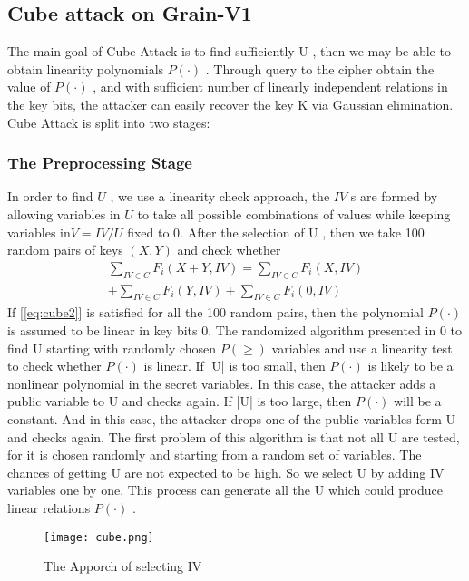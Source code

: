 \subsection{Cube attack on Grain-V1}
The main goal of Cube Attack is to find sufficiently U , then we may be able to
obtain linearity polynomials $P(\cdot)$ . Through query to the cipher obtain the value of
$P(\cdot)$ , and with sufficient number of linearly independent relations in the key bits,
the attacker can easily recover the key K via Gaussian elimination. Cube Attack is
split into two stages:
\subsubsection{The Preprocessing Stage}
In order to find $U$ , we use a linearity check approach, the $IV$ s are formed by
allowing variables in $U$ to take all possible combinations of values while keeping
variables in$ V  = IV/U$ fixed to 0. After the selection of U , then we take 100 random
pairs of keys $(X,Y)$  and check whether 
\begin{multline} \label{eq:cube2}
	\sum_{IV \in C} F_i(X+Y,IV) = \sum_{IV \in C} F_i(X,IV)\\ +\sum_{IV \in C} F_i(Y,IV) + \sum_{IV \in C} F_i(0,IV)
\end{multline}
If [\ref{eq:cube2}] is satisfied for all the 100 random pairs, then the polynomial $P(\cdot)$ is assumed to
be linear in key bits 0. The randomized algorithm presented in 0 to find U starting
with randomly chosen $P(\geq)$  variables and use a linearity test to check whether $P(\cdot)$
is linear. If |U| is too small, then $P(\cdot)$ is likely to be a nonlinear polynomial in the
secret variables. In this case, the attacker adds a public variable to U and checks
again. If |U| is too large, then $P(\cdot)$ will be a constant. And in this case, the attacker
drops one of the public variables form U and checks again. The first problem of this
algorithm is that not all U are tested, for it is chosen randomly and starting from a
random set of variables. The chances of getting U are not expected to be high. So we
select U by adding IV variables one by one. This process can generate all the U
which could produce linear relations $P(\cdot)$ .
\begin{figure}[h]
	\centering
	\texttt{[image: cube.png]}
	\caption{The Apporch of selecting IV}
\end{figure}

